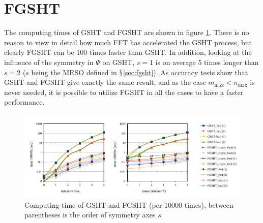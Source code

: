 \section{FGSHT}

The computing times of \acs{GSHT} and \acs{FGSHT} are shown in figure
\ref{fig:time-gsht-fgsht}. There is no reason to view in detail how
much \acs{FFT} has accelerated the \acs{GSHT} process, but clearly
\acs{FGSHT} can be 100 times faster than \acs{GSHT}. In addition, looking
at the influence of the symmetry in $\Psi$ on \acs{GSHT}, $s=1$
is on average 5 times longer than $s=2$ ($s$ being the \acs{MRSO}
defined in $\mathsection$\ref{sec:fgsht}). As accuracy tests show
that \acs{GSHT} and \acs{FGSHT} give exactly the same result, and
as the case $m_{\max}<n_{\max}$ is never needed, it is possible to
utilize \acs{FGSHT} in all the cases to have a faster performance.
\begin{center}
\begin{figure}[H]
\begin{centering}
\includegraphics[bb=0bp 20bp 731bp 263bp,width=1\columnwidth]{_figure/results/fgsht_perf}
\par\end{centering}
\caption[Computing time of \acs{GSHT} and \acs{FGSHT}]{Computing time of \acs{GSHT} and \acs{FGSHT} (per 10000 times),
between parentheses is the order of symmetry axes $s$\label{fig:time-gsht-fgsht}}
\end{figure}
\par\end{center}

